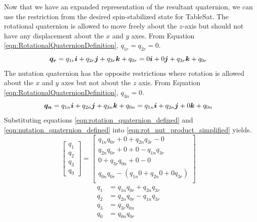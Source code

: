 Now that we have an expanded representation of the resultant quaternion, we can use the restriction from the desired spin-stabilized state for TableSat.  The rotational quaternion is allowed to move freely about the $z$-axis but should not have any displacement about the $x$ and $y$ axes.  From Equation \ref{eqn:RotationalQuaternionDefinition}, $q_{1r} = q_{2r} = 0$.
\begin{equation}
  \boldsymbol{q_{r}}
  = q_{1r} \boldsymbol{i} + q_{2r} \boldsymbol{j} + q_{3r} \boldsymbol{k} + q_{0r}
  = 0 \boldsymbol{i} + 0 \boldsymbol{j} + q_{3r} \boldsymbol{k} + q_{0r}
  \label{eqn:rotation_quaternion_defined}
\end{equation}
The nutation quaternion has the opposite restrictions where rotation is allowed about the $x$ and $y$ axes but not about the $z$ axis.  From Equation \ref{eqn:RotationalQuaternionDefinition}, $q_{3n} = 0$.
\begin{equation}
  \boldsymbol{q_{n}}
  = q_{1n} \boldsymbol{i} + q_{2n} \boldsymbol{j} + q_{3n} \boldsymbol{k} + q_{0n}
  = q_{1n} \boldsymbol{i} + q_{2n} \boldsymbol{j} + 0 \boldsymbol{k} + q_{0n}
  \label{eqn:nutation_quaternion_defined}
\end{equation}
Substituting equations \eqref{eqn:rotation_quaternion_defined} and \eqref{eqn:nutation_quaternion_defined} into \eqref{eqn:rot_nut_product_simplified} yields.
\begin{equation}
  \begin{bmatrix}
    q_{1} \\
    q_{2} \\
    q_{3} \\
    q_{0}
  \end{bmatrix}
  =
  \begin{bmatrix}
    q_{1n} q_{0r} + 0             + q_{2n} q_{3r} - 0 \\
    q_{2n} q_{0r} + 0             + 0             - q_{1n} q_{3r} \\
    0             + q_{3r} q_{0n} + 0             - 0 \\
  q_{0n} q_{0r} - (q_{1n} 0 + q_{2n} 0 + 0 q_{3r} ) \\
  \end{bmatrix}
\end{equation}
\begin{subequations}
  \begin{align}
    q_{1} &= q_{1n} q_{0r} + q_{2n} q_{3r} \label{eqn:rot_nut_1_1} \\
    q_{2} &= q_{2n} q_{0r} - q_{1n} q_{3r} \label{eqn:rot_nut_1_2} \\
    q_{3} &= q_{3r} q_{0n} \label{eqn:rot_nut_1_3} \\
    q_{0} &= q_{0n} q_{0r} \label{eqn:rot_nut_1_0}
  \end{align}
\end{subequations}
